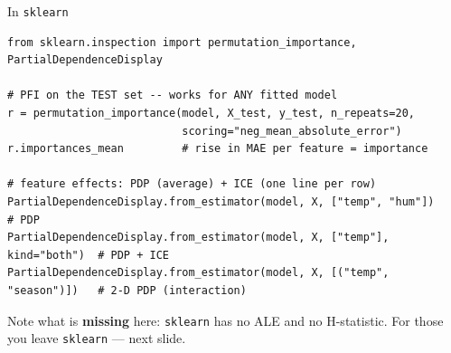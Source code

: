 \documentclass[aspectratio=169]{beamer}
\begin{document}
\begin{frame}[fragile]{In \texttt{sklearn}}
\begin{lstlisting}
from sklearn.inspection import permutation_importance, PartialDependenceDisplay

# PFI on the TEST set -- works for ANY fitted model
r = permutation_importance(model, X_test, y_test, n_repeats=20,
                           scoring="neg_mean_absolute_error")
r.importances_mean         # rise in MAE per feature = importance

# feature effects: PDP (average) + ICE (one line per row)
PartialDependenceDisplay.from_estimator(model, X, ["temp", "hum"])      # PDP
PartialDependenceDisplay.from_estimator(model, X, ["temp"], kind="both")  # PDP + ICE
PartialDependenceDisplay.from_estimator(model, X, [("temp", "season")])   # 2-D PDP (interaction)
\end{lstlisting}
  \vskip 2pt
  \footnotesize Note what is \textbf{missing} here: \texttt{sklearn} has no ALE and no
  H-statistic. For those you leave \texttt{sklearn} --- next slide.
\end{frame}
\end{document}
